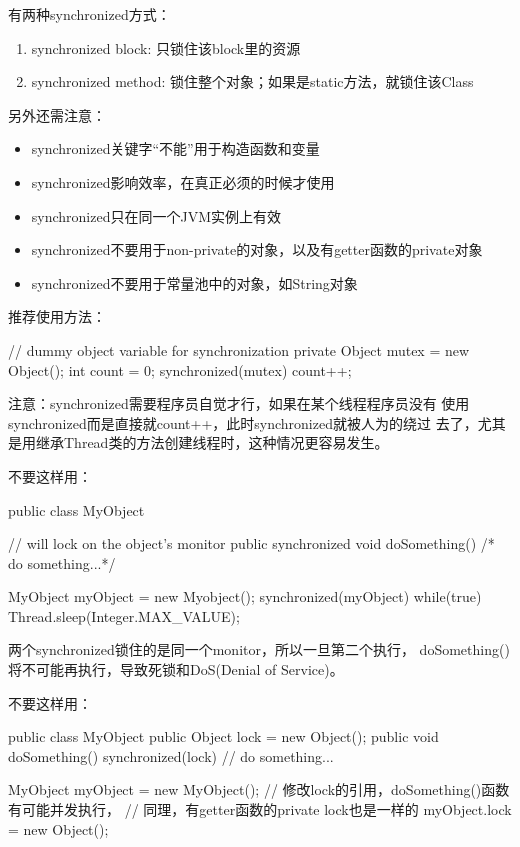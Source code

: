 \documentclass[a4paper,11pt]{article}
\begin{document}
有两种synchronized方式：
\begin{enumerate}
\item synchronized block: 只锁住该block里的资源
\item synchronized method: 锁住整个对象；如果是static方法，就锁住该Class
\end{enumerate}
另外还需注意：
\begin{itemize}
\item synchronized关键字“不能”用于构造函数和变量
\item synchronized影响效率，在真正必须的时候才使用
\item synchronized只在同一个JVM实例上有效
\item synchronized不要用于non-private的对象，以及有getter函数的private对象
\item synchronized不要用于常量池中的对象，如String对象
\end{itemize}
推荐使用方法：\\
\begin{javacode}
// dummy object variable for synchronization
private Object mutex = new Object();
int count = 0;
synchronized(mutex) {
    count++;
}
\end{javacode}

注意：synchronized需要程序员自觉才行，如果在某个线程程序员没有
使用synchronized而是直接就count++，此时synchronized就被人为的绕过
去了，尤其是用继承Thread类的方法创建线程时，这种情况更容易发生。

不要这样用：\\
\begin{javacode}
public class MyObject {
    // will lock on the object's monitor
    public synchronized void doSomething() { /* do something...*/ }

    MyObject myObject = new Myobject();
    synchronized(myObject) {
        while(true) {
            Thread.sleep(Integer.MAX_VALUE);
        }
    }
}
\end{javacode}

两个synchronized锁住的是同一个monitor，所以一旦第二个执行，
doSomething()将不可能再执行，导致死锁和DoS(Denial of Service)。

不要这样用：\\
\begin{javacode}
public class MyObject {
    public Object lock = new Object();
    public void doSomething() {
        synchronized(lock) {
            // do something...
        }
    }
}

MyObject myObject = new MyObject();
// 修改lock的引用，doSomething()函数有可能并发执行，
// 同理，有getter函数的private lock也是一样的
myObject.lock = new Object();
\end{javacode}
\end{document}
